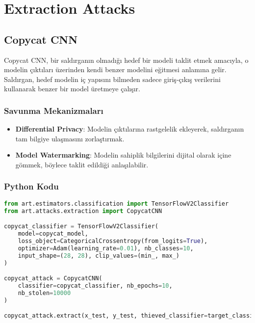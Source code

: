 \section{Extraction Attacks}

\subsection{Copycat CNN}

Copycat CNN, bir saldırganın olmadığı hedef bir modeli taklit etmek amacıyla, o modelin çıktıları üzerinden kendi benzer modelini eğitmesi anlamına gelir. Saldırgan, hedef modelin iç yapısını bilmeden sadece giriş-çıkış verilerini kullanarak benzer bir model üretmeye çalışır.

\subsubsection{Savunma Mekanizmaları}

\begin{itemize}
    \item \textbf{Differential Privacy}: Modelin çıktılarına rastgelelik ekleyerek, saldırganın tam bilgiye ulaşmasını zorlaştırmak.
    \item \textbf{Model Watermarking}: Modelin sahiplik bilgilerini dijital olarak içine gömmek, böylece taklit edildiği anlaşılabilir.
\end{itemize}

\subsubsection{Python Kodu}

\begin{lstlisting}[language=Python]
from art.estimators.classification import TensorFlowV2Classifier
from art.attacks.extraction import CopycatCNN

copycat_classifier = TensorFlowV2Classifier(
    model=copycat_model, 
    loss_object=CategoricalCrossentropy(from_logits=True), 
    optimizer=Adam(learning_rate=0.01), nb_classes=10,
    input_shape=(28, 28), clip_values=(min_, max_)
)

copycat_attack = CopycatCNN(
    classifier=copycat_classifier, nb_epochs=10,
    nb_stolen=10000
)

copycat_attack.extract(x_test, y_test, thieved_classifier=target_classifier)
\end{lstlisting}

\newpage

